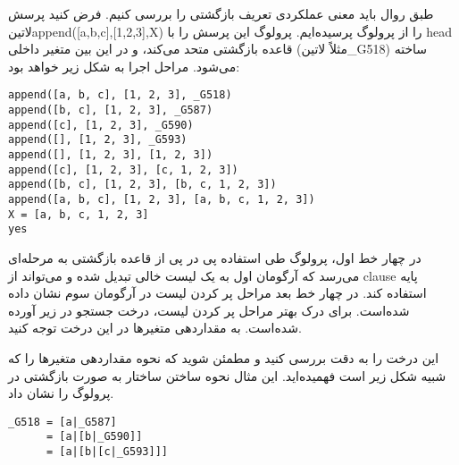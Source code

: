 طبق روال باید معنی عملکردی تعریف بازگشتی را بررسی کنیم. فرض کنید پرسش ‌لاتین{append([a,b,c],[1,2,3],X)} را از پرولوگ پرسیده‌ایم. پرولوگ این پرسش را با head قاعده بازگشتی متحد می‌کند، و در این بین متغیر داخلی (مثلاً  ‌لاتین{\_G518}) ساخته می‌شود. مراحل اجرا به شکل زیر خواهد بود:

\begin{latin}
\begin{lstlisting}
append([a, b, c], [1, 2, 3], _G518)
append([b, c], [1, 2, 3], _G587)
append([c], [1, 2, 3], _G590)
append([], [1, 2, 3], _G593)
append([], [1, 2, 3], [1, 2, 3])
append([c], [1, 2, 3], [c, 1, 2, 3])
append([b, c], [1, 2, 3], [b, c, 1, 2, 3])
append([a, b, c], [1, 2, 3], [a, b, c, 1, 2, 3])
X = [a, b, c, 1, 2, 3]
yes
\end{lstlisting}
\end{latin}

در چهار خط اول، پرولوگ طی استفاده پی در پی از قاعده بازگشتی به مرحله‌ای می‌رسد که آرگومان اول به یک لیست خالی تبدیل شده و می‌تواند از clause پایه استفاده کند. در چهار خط بعد مراحل پر کردن لیست در آرگومان سوم نشان داده شده‌است. برای درک بهتر مراحل پر کردن لیست، درخت جستجو در زیر آورده شده‌است. به مقداردهی متغیرها در این درخت توجه کنید.

\begin{latin}
\end{latin}

این درخت را به دقت بررسی کنید و مطمئن شوید که نحوه مقداردهی متغیرها را که شبیه شکل زیر است فهمیده‌اید. این مثال نحوه ساختن ساختار به صورت بازگشتی در پرولوگ را نشان داد.

\begin{latin}
\begin{lstlisting}
_G518 = [a|_G587]
      = [a|[b|_G590]]
      = [a|[b|[c|_G593]]]
\end{lstlisting}
\end{latin}

